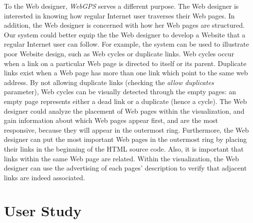 \documentclass[10pt,psfig]{article}
\begin{document}
{To the Web designer, {\em WebGPS} serves a different purpose.  The Web designer is interested in knowing how regular Internet user traverses their Web pages.
In addition, the Web designer is concerned with how her Web pages are structured.  
Our system could better equip the the Web designer to develop a Website that a regular Internet user can follow.  
For example, the system can be used to illustrate poor Website design, such as Web cycles or duplicate links.  
Web cycles occur when a link on a particular Web page is directed to itself or its parent. 
Duplicate links exist when a Web page has more than one link which point to the same web address.  
By not allowing duplicate links (checking the {\em allow duplicates} parameter), Web cycles can be visually detected through the empty pages: an empty page represents either a dead link or a duplicate (hence a cycle).
The Web designer could analyze the placement of Web pages within the visualization, and gain information about which Web pages appear first, and are the most responsive, because they will appear in the outermost ring.
Furthermore, the Web designer can put the most important Web pages in the outermost ring by placing their links in the beginning of the HTML source code.
Also, it is important that links within the same Web page are related.  Within the visualization, the Web designer can use the advertising of each pages' description to verify that adjacent links are indeed associated.

\section{User Study}
\label{se:user_study}

}
\end{document}
